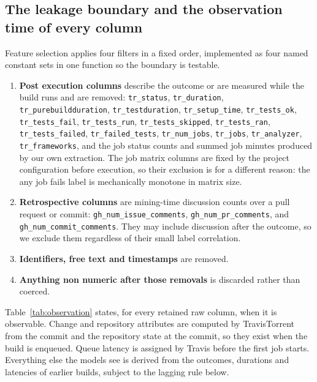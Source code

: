 \documentclass[sigconf,review,anonymous,nonacm]{acmart}
\newcommand{\col}[1]{\texttt{#1}}
\begin{document}
\subsection{The leakage boundary and the observation time of every column}
\label{sec:design-leakage}

Feature selection applies four filters in a fixed order, implemented as four named constant sets in one function so the boundary is testable.

\begingroup\sloppy
\begin{enumerate}
  \item \textbf{Post execution columns} describe the outcome or are measured while the build runs and are removed: \col{tr\_status}, \col{tr\_duration}, \col{tr\_purebuildduration}, \col{tr\_testduration}, \col{tr\_setup\_time}, \col{tr\_tests\_ok}, \col{tr\_tests\_fail}, \col{tr\_tests\_run}, \col{tr\_tests\_skipped}, \col{tr\_tests\_ran}, \col{tr\_tests\_failed}, \col{tr\_failed\_tests}, \col{tr\_num\_jobs}, \col{tr\_jobs}, \col{tr\_analyzer}, \col{tr\_frameworks}, and the job status counts and summed job minutes produced by our own extraction. The job matrix columns are fixed by the project configuration before execution, so their exclusion is for a different reason: the any job fails label is mechanically monotone in matrix size.
  \item \textbf{Retrospective columns} are mining-time discussion counts over a pull request or commit: \col{gh\_num\_issue\_comments}, \col{gh\_num\_pr\_comments}, and \col{gh\_num\_commit\_comments}. They may include discussion after the outcome, so we exclude them regardless of their small label correlation.
  \item \textbf{Identifiers, free text and timestamps} are removed.
  \item \textbf{Anything non numeric after those removals} is discarded rather than coerced.
\end{enumerate}
\endgroup

Table~\ref{tab:observation} states, for every retained raw column, when it is observable. Change and repository attributes are computed by TravisTorrent from the commit and the repository state at the commit, so they exist when the build is enqueued. Queue latency is assigned by Travis before the first job starts. Everything else the models see is derived from the outcomes, durations and latencies of earlier builds, subject to the lagging rule below.
\end{document}
